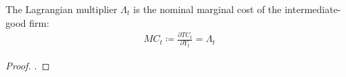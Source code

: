\documentclass[../thesis.tex]{subfiles}
\begin{document}
\begin{lemma}\label{lemma:marginal-cost}
	The Lagrangian multiplier $\Lambda_t$ is the nominal marginal cost of the intermediate-good firm:
	\begin{align*}
		MC_t \coloneq \frac{\partial TC_t}{\partial Y_t} = \Lambda_t
	\end{align*}
	
	\begin{proof}
		\textcite[p.449]{simon_mathematics_1994}.
	\end{proof}
	
\end{lemma}

\begin{comment}


\begin{definition}[Constant Returns to Scale]
	\cite[Lecture 1, p.5]{solis-garcia_ucb_2022}
\end{definition}

\begin{definition}[Homogeneous Function of Degree $k$]
	\cite[Lecture 1, p.5]{solis-garcia_ucb_2022}
\end{definition}

\subsubsection*{Monetary Authority}

\subsubsection*{Shocks}

\subsubsection*{Equilibrium Conditions}

\begin{definition}[Competitive Equilibrium]
	\cite[Lecture 1, p.6]{solis-garcia_ucb_2022}
\end{definition}


\subsubsection*{Steady State}

\end{comment}
\end{document}
